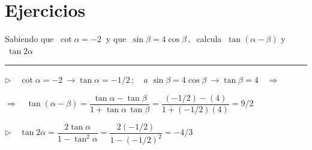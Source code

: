 \vspace{1cm}%
\section{Ejercicios}
\vspace{0.5cm}

\begin{miejercicio}

Sabiendo que $\ \cot \alpha=-2\ $ y que $\ \sin \beta=4\cos \beta\, , \ $ calcula $\ \tan (\alpha-\beta) $ y $\ \tan 2\alpha$ 

\rule{250pt}{0.1pt}

\vspace{4mm}

$\triangleright \quad \cot \alpha=-2\ \to \tan \alpha = -1/2\, ; \quad a $ 
$\sin \beta=4\cos \beta \ \to \tan \beta= 4 \quad \Rightarrow $	

\vspace{2mm} \hspace{2cm} $\Rightarrow \quad \tan (\alpha-\beta)= \dfrac{\tan \alpha - \tan \beta}{1+\tan \alpha \, \tan \beta} = \dfrac{(-1/2)-(4)}{1+(-1/2)(4)}=9/2$

\vspace{2mm}  $\triangleright \quad \tan 2 \alpha = \dfrac{2\tan \alpha}{1-\tan^2 \alpha}=\dfrac{2(-1/2)}{1-(-1/2)^2}=-4/3$


\end{miejercicio}


